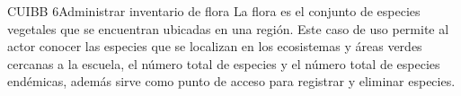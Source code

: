 
\begin{UseCase}{CUIBB 6}{Administrar inventario de flora}
    {
	La flora es el conjunto de especies vegetales que se encuentran ubicadas en una región. Este caso de uso permite al actor conocer las especies que se localizan en los ecosistemas y áreas verdes cercanas a la escuela, el número total de especies y el número total de especies endémicas, además sirve como punto de acceso para registrar y eliminar especies. 
    }
    
    


\end{UseCase}
